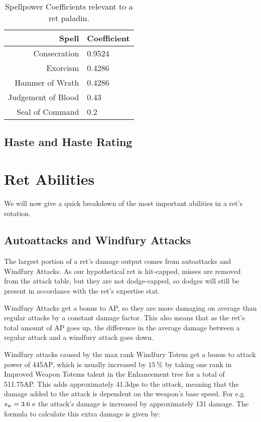 \documentclass[letterpaper,11pt]{article}
\begin{document}
	\begin{table}[htb]
		\centering
		\begin{tabular}{r | l}
			Spell & Coefficient \\
			\hline \hline
			Consecration & 0.9524 \\
			Exorcism & 0.4286 \\
			Hammer of Wrath & 0.4286 \\
			Judgement of Blood & 0.43 \\
			Seal of Command & 0.2 \\
			\hline
		\end{tabular}
		\caption{Spellpower Coefficients relevant to a ret paladin.}		
		\label{tab:spellcoefficients}
	\end{table}

	\subsection{Haste and Haste Rating}
	
	\section{Ret Abilities}
	We will now give a quick breakdown of the most important abilities in a ret's rotation.

	\subsection{Autoattacks and Windfury Attacks}
	The largest portion of a ret's damage output comes from autoattacks and Windfury Attacks.
	As our hypothetical ret is hit-capped, misses are removed from the attack table, but they are not dodge-capped, so dodges will still be present in accordance with the ret's expertise stat.
	
	Windfury Attacks get a bonus to AP, so they are more damaging on average than regular attacks by a constant damage factor.
	This also means that as the ret's total amount of AP goes up, the difference in the average damage between a regular attack and a windfury attack goes down.
	
	Windfury attacks caused by the max rank Windfury Totem get a bonus to attack power of 445AP, which is usually increased by $15~\%$ by taking one rank in Improved Weapon Totems talent in the Enhancement tree for a total of 511.75AP.
	This adds approximately 41.3dps to the attack, meaning that the damage added to the attack is dependent on the weapon's base speed.
	For e.g. $s_\mathrm{w}  = 3.6~\mathrm{s}$ the attack's damage is increased by approximately 131 damage.
	The formula to calculate this extra damage is given by:
	
\end{document}
